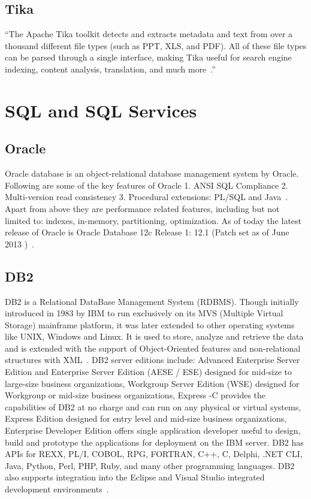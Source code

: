      \pv
     
\subsection{Tika}

``The Apache Tika toolkit detects and extracts metadata and text from
over a thousand different file types (such as PPT, XLS, and PDF). All
of these file types can be parsed through a single interface, making
Tika useful for search engine indexing, content analysis, translation,
and much more~\cite{www-tika}.''


\section{SQL and SQL Services}
\label{S:o-sql}

\subsection{Oracle}

Oracle database is an object-relational database management system by
Oracle. Following are some of the key features of Oracle 1. ANSI SQL
Compliance 2. Multi-version read consistency 3. Procedural extensions:
PL/SQL and Java~\cite{www-oracle}.  Apart from above they are
performance related features, including but not limited to: indexes,
in-memory, partitioning, optimization.  As of today the latest release
of Oracle is Oracle Database 12c Release 1: 12.1 (Patch set as of June
2013 )~\cite{www-oracle}.

     \pv


\subsection{DB2}

DB2 is a Relational DataBase Management System (RDBMS). Though
initially introduced in 1983 by IBM to run exclusively on its MVS
(Multiple Virtual Storage) mainframe platform, it was later extended
to other operating systems like UNIX, Windows and Linux. It is used to
store, analyze and retrieve the data and is extended with the support
of Object-Oriented features and non-relational structures with
XML~\cite{www-DB2Intro}. DB2 server editions include: Advanced
Enterprise Server Edition and Enterprise Server Edition (AESE / ESE)
designed for mid-size to large-size business organizations, Workgroup
Server Edition (WSE) designed for Workgroup or mid-size business
organizations, Express -C provides the capabilities of DB2 at no
charge and can run on any physical or virtual systems, Express Edition
designed for entry level and mid-size business organizations,
Enterprise Developer Edition offers single application developer
useful to design, build and prototype the applications for deployment
on the IBM server. DB2 has APIs for REXX, PL/I, COBOL, RPG, FORTRAN,
C++, C, Delphi, .NET CLI, Java, Python, Perl, PHP, Ruby, and many
other programming languages. DB2 also supports integration into the
Eclipse and Visual Studio integrated development
environments~\cite{www-DB2Wiki}.

